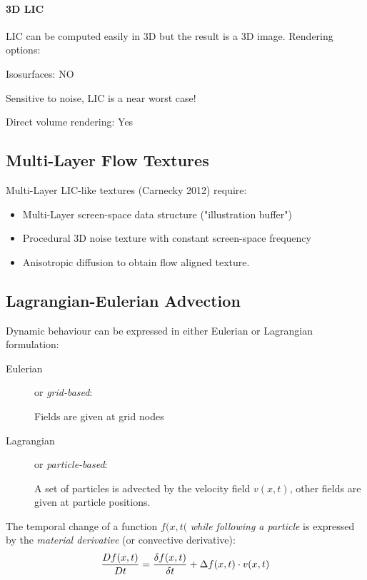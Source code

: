 \paragraph{3D LIC} LIC can be computed easily in 3D but the result is a 3D image. Rendering options:
\begin{description}
    \item Isosurfaces: NO
        
        Sensitive to noise, LIC is a near worst case!
        
    \item Direct volume rendering: Yes
\end{description}

\subsection{Multi-Layer Flow Textures}

Multi-Layer LIC-like textures (Carnecky 2012) require:
\begin{itemize}
    \item Multi-Layer screen-space data structure ("illustration buffer")
    \item Procedural 3D noise texture with constant screen-space frequency
    \item Anisotropic diffusion to obtain flow aligned texture. 
\end{itemize}

\subsection{Lagrangian-Eulerian Advection}
Dynamic behaviour can be expressed in either Eulerian or Lagrangian formulation:
\begin{description}
\item[Eulerian] or \emph{grid-based}:

Fields are given at grid nodes
\item[Lagrangian] or \emph{particle-based}: 

A set of particles is advected by the velocity field $v(x,t)$, other fields are given at particle positions.
\end{description}

The temporal change of a function $f(x,t($ \emph{while following a particle} is expressed by the \emph{material derivative} (or convective derivative):
\begin{align*}
    {Df(x,t)\over Dt} = {\delta f(x,t)\over \delta t} + \Delta f(x,t)\cdot v(x,t)
\end{align*}


